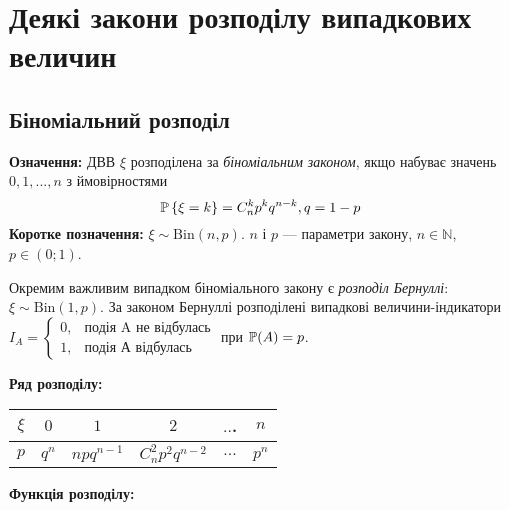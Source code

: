 \section{Деякі закони розподілу випадкових величин}

\subsection{Біноміальний розподіл}
\noindent\textbf{Означення:}
    ДВВ $\xi$ розподілена за \emph{біноміальним законом}, 
    якщо набуває значень $0,1,...,n$ з ймовірностями \begin{equation}
        \P\left\{\xi = k\right\} = C_n^k p^k q^{n-k}, q = 1 - p
    \end{equation}
\textbf{Коротке позначення:} $\xi \sim \mathrm{Bin}(n, p)$.
    $n$ і $p$ --- параметри закону, $n\in \mathbb{N}$, $p\in (0;1)$.

Окремим важливим випадком біноміального закону є \emph{розподіл Бернуллі}: $\xi \sim \mathrm{Bin}(1, p)$.
За законом Бернуллі розподілені випадкові величини-індикатори $I_A = \begin{cases}
    0, & \text{подія A не відбулась}\\ 1, & \text{подія А відбулась}
\end{cases}$ при $\P(A) = p$.

\noindent\textbf{Ряд розподілу:}

\begin{tabular}{|c|c|c|c|c|c|}
    \hline
    $\xi$ & $0$ & $1$ & $2$ & $..$. & $n$ \\
    \hline
    $p$ & $q^n$ & $npq^{n-1}$ & $C_n^2 p^2 q^{n-2}$ & $...$ & $p^n$ \\
    \hline
\end{tabular}

\noindent\textbf{Функція розподілу:}

